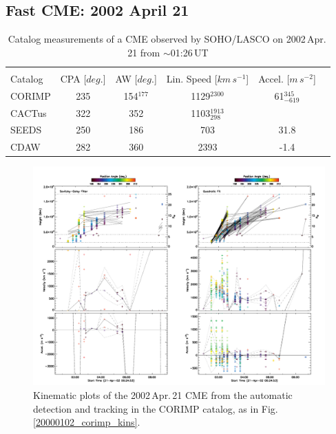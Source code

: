 \documentclass[referee,a4paper,12pt,traditabstract]{swsc}
\begin{document}
\begin{linenumbers}
\subsection{Fast CME: 2002 April 21}
\label{sect_20020421}

\begin{table}[h]
\begin{tabular}{l*{4}{c}r}
\multicolumn{5}{c}{} \\

Catalog              & CPA [$deg.$] & AW [$deg.$] & Lin. Speed [$km\,s^{-1}$] & Accel. [$m\,s^{-2}$]  \\
\hline
CORIMP   & 235 & 154$^{177}$ & 1129$^{2300}$ & 61$_{-619}^{345}$ \\
CACTus   & 322 & 352 & 1103$_{298}^{1913}$ &  \\
SEEDS    & 250 & 186 & 703 & 31.8 \\
CDAW      & 282 & 360 & 2393 & -1.4 \\
\end{tabular}
\caption{Catalog measurements of a CME observed by SOHO/LASCO on 2002\,Apr.\,21 from $\sim$01:26\,UT}
\label{table_20020421}
\end{table}

\begin{figure}[t]
\centerline{\includegraphics[width=\linewidth]{images/20020421_corimp_kins.pdf}}
\caption{Kinematic plots of the 2002\,Apr.\,21 CME from the automatic detection and tracking in the CORIMP catalog, as in Fig.\,\ref{20000102_corimp_kins}.}
\label{20020421_corimp_kins}
\end{figure}



\end{linenumbers}
\end{document}
